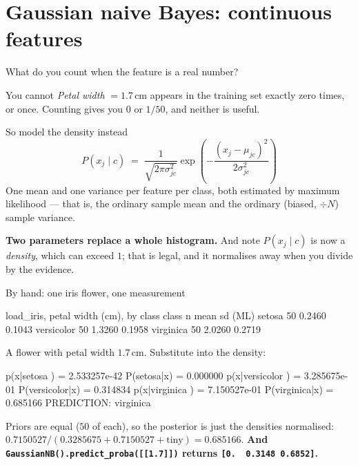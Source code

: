 \documentclass[aspectratio=169]{beamer}
\begin{document}
\section[Gaussian NB]{Gaussian naive Bayes: continuous features}
\label{sec:gauss}

\begin{frame}[shrink=6]{What do you count when the feature is a real number?}
  \begin{alertblock}{You cannot}
    \small \emph{Petal width} $=1.7$\,cm appears in the training set exactly
    zero times, or once. Counting gives you $0$ or $1/50$, and neither is
    useful.
  \end{alertblock}
  \begin{exampleblock}{So model the density instead}
    \[
      P(x_j \mid c) \;=\; \frac{1}{\sqrt{2\pi\sigma_{jc}^{2}}}
        \exp\!\left(-\frac{(x_j - \mu_{jc})^{2}}{2\sigma_{jc}^{2}}\right)
    \]
    \small One mean and one variance per feature per class, both estimated by
    maximum likelihood --- that is, the ordinary sample mean and the
    ordinary (biased, $\div N$) sample variance.
  \end{exampleblock}
  \begin{center}\small
    \textbf{Two parameters replace a whole histogram.} And note $P(x_j \mid
    c)$ is now a \emph{density}, which can exceed $1$; that is legal, and it
    normalises away when you divide by the evidence.
  \end{center}
\end{frame}

\begin{frame}[fragile,shrink=7]{By hand: one iris flower, one measurement}
\begin{outblk}
load_iris, petal width (cm), by class
   class          n      mean   sd (ML)
   setosa        50    0.2460    0.1043
   versicolor    50    1.3260    0.1958
   virginica     50    2.0260    0.2719
\end{outblk}
A flower with petal width $1.7$\,cm. Substitute into the density:
\begin{outblk}
      p(x|setosa     ) = 2.533257e-42   P(setosa|x) = 0.000000
      p(x|versicolor ) = 3.285675e-01   P(versicolor|x) = 0.314834
      p(x|virginica  ) = 7.150527e-01   P(virginica|x) = 0.685166
      PREDICTION: virginica
\end{outblk}
\begin{center}\small
  Priors are equal ($50$ of each), so the posterior is just the densities
  normalised: $0.7150527 / (0.3285675 + 0.7150527 + \text{tiny})
  = 0.685166$. \textbf{And \texttt{GaussianNB().predict\_proba([[1.7]])}
  returns \texttt{[0.\ \ 0.3148\ 0.6852]}.}
\end{center}
\end{frame}
\end{document}
